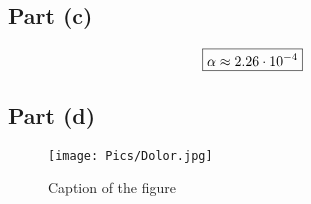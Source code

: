 \documentclass[11pt,a4paper,titlepage]{article}
\begin{document}
\subsection*{Part (c)}
\begin{align*}
\Aboxed{\alpha \approx 2.26 \cdot 10^{-4}}
\end{align*}

\subsection*{Part (d)}
\begin{figure}[!htb]
\centering
\texttt{[image: Pics/Dolor.jpg]}
\caption{Caption of the figure}
\label{fig:q3fig1}
\end{figure}

\end{document}
